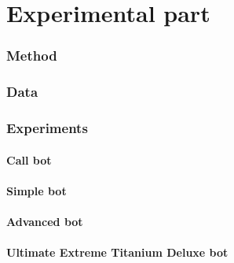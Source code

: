 \part{Experimental part}

\section{Method}
\section{Data}
\section{Experiments}
\subsection{Call bot}
\subsection{Simple bot}
\subsection{Advanced bot}
\subsection{Ultimate Extreme Titanium Deluxe bot}